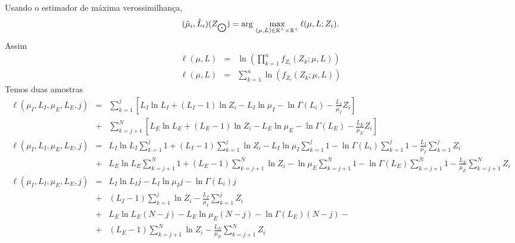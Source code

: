 Usando o estimador de máxima verossimilhança, 
\begin{equation}\label{cap_acf_16}
    (\hat{\mu}_i, \hat{L}_i)(Z_{\bigodot})= \text{arg}\,\max\limits_{(\mu, L)\in \mathbb{R}^{+}\times \mathbb{R}^{+}}\ell(\mu,L;Z_i).\\
\end{equation}
Assim
\begin{equation}\label{cap_acf_16}
\begin{array}{ccc}
 \ell(\mu, L)&=&\ln\left(\prod_{k=1}^{n}f_{Z_{i}}(Z_{k};\mu,L)\right)\\
  \ell(\mu, L)&=&\sum_{k=1}^{n}\ln\left(f_{Z_{i}}(Z_{k};\mu,L)\right)
 \end{array}
 \end{equation}
Temos duas amostras
\begin{equation}\label{cap_acf_16}
 \begin{array}{lll}
\ell(\mu_I, L_I,\mu_E, L_E, j)&=&\sum_{k=1}^{j}     \left[   L_I\ln L_I +(L_I   - 1) \ln Z_{i}-L_I \ln \mu_I-\ln \Gamma(L_i) -\frac{L_I}{\mu_I} Z_i \right]\\
                                               &+&\sum_{k=j+1}^{N}\left[   L_E\ln L_E +(L_E - 1) \ln Z_{i}-L_E \ln \mu_E-\ln \Gamma(L_E) -\frac{L_E}{\mu_E} Z_i \right]\\
\ell(\mu_I, L_I,\mu_E, L_E, j)&=&  L_I\ln L_I \sum_{k=1}^{j} 1 +(L_I   - 1) \sum_{k=1}^{j}  \ln Z_{i}-L_I \ln \mu_I\sum_{k=1}^{j} 1-\ln \Gamma(L_i) \sum_{k=1}^{j} 1  -\frac{L_I}{\mu_I} \sum_{k=1}^{j}   Z_i \\
                                               &+&  L_E\ln L_E \sum_{k=j+1}^{N}1+(L_E - 1) \sum_{k=j+1}^{N}\ln Z_{i}- \ln \mu_E\sum_{k=j+1}^{N}1-\ln \Gamma(L_E)\sum_{k=j+1}^{N} 1-\frac{L_E}{\mu_E} \sum_{k=j+1}^{N}Z_i \\
\ell(\mu_I, L_I,\mu_E, L_E, j)&=&  L_I\ln L_I j-L_I \ln \mu_I j-\ln \Gamma(L_i) j \\
&+& (L_I  - 1) \sum_{k=1}^{j}  \ln Z_{i}  -\frac{L_I}{\mu_I} \sum_{k=1}^{j}   Z_i \\
                                               &+&  L_E\ln L_E (N-j)-L_E \ln \mu_E(N-j)-\ln \Gamma(L_E)(N-j)- \\
                                               &+& (L_E - 1) \sum_{k=j+1}^{N}\ln Z_{i}-\frac{L_E}{\mu_E} \sum_{k=j+1}^{N}Z_i \\
                                                \end{array}
 \end{equation}


